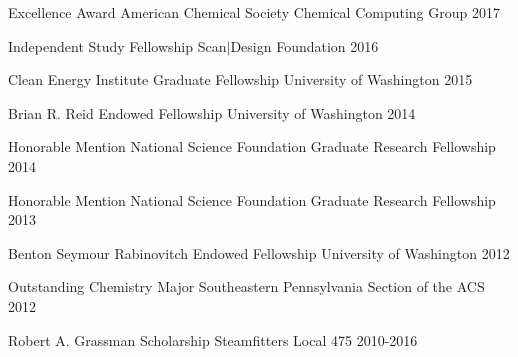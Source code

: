 



\begin{cvhonors}

\cvhonor
{Excellence Award} %
{American Chemical Society Chemical Computing Group} %
{} %
{2017} %


\cvhonor
{Independent Study Fellowship} %
{Scan$|$Design Foundation} %
{} %
{2016} %


\cvhonor
{Clean Energy Institute Graduate Fellowship} %
{University of Washington} %
{} %
{2015} %


\cvhonor
{Brian R. Reid Endowed Fellowship} %
{University of Washington} %
{} %
{2014} %


\cvhonor
{Honorable Mention} %
{National Science Foundation Graduate Research Fellowship} %
{} %
{2014} %


\cvhonor
{Honorable Mention} %
{National Science Foundation Graduate Research Fellowship} %
{} %
{2013} %


\cvhonor
{Benton Seymour Rabinovitch Endowed Fellowship} %
{University of Washington} %
{} %
{2012} %


\cvhonor
{Outstanding Chemistry Major} %
{Southeastern Pennsylvania Section of the ACS} %
{} %
{2012} %


\cvhonor
{Robert A. Grassman Scholarship} %
{Steamfitters Local 475} %
{} %
{2010-2016} %


\end{cvhonors}
\vspace{-1cm}
